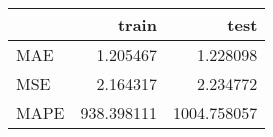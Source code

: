 \begin{tabular}{lrr}
\toprule
{} &       train &         test \\
\midrule
MAE  &    1.205467 &     1.228098 \\
MSE  &    2.164317 &     2.234772 \\
MAPE &  938.398111 &  1004.758057 \\
\bottomrule
\end{tabular}
